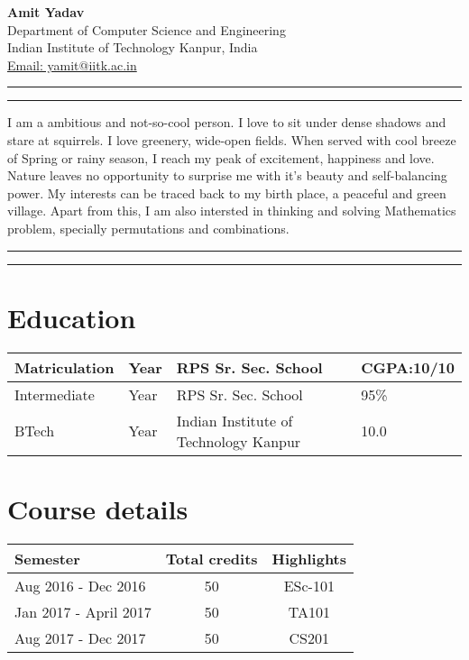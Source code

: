 \documentclass{article}
\begin{document}
\noindent\textbf{Amit Yadav}\\
Department of Computer Science and Engineering \\
Indian Institute of Technology Kanpur, India\\
\href{yamit@iitk.ac.in}{Email: yamit@iitk.ac.in}\\
\hrule
\vspace{1mm}
\hrule
\vspace{1mm}
\noindent I am a ambitious and not-so-cool person. I love to sit under dense shadows and stare at squirrels. I love greenery, wide-open fields. When served with cool breeze of Spring or rainy season, I reach my peak of excitement, happiness and  love. Nature leaves no opportunity to surprise me with it's beauty and self-balancing power. My interests can be traced back to my birth place, a peaceful and green village.
Apart from this, I am also intersted in thinking and solving Mathematics problem, specially permutations and combinations.
\vspace{1mm}
\hrule
\vspace{1mm}
\hrule

\section*{Education}
\begin{tabular}{|l|l|l|l|}
\hline
    Matriculation & Year & RPS Sr. Sec. School & CGPA:10/10\\
\hline
    Intermediate & Year & RPS Sr. Sec. School & 95\%\\
\hline
    BTech & Year & Indian Institute of Technology Kanpur & 10.0 \\
\hline
\end{tabular}

\section*{Course details}
\begin{tabular}{|l|c|c|}
    \hline
    \textbf{Semester} & \textbf{Total credits} & \textbf{Highlights} \\
    \hline
     Aug 2016 - Dec 2016 & 50 & ESc-101 \\
     \hline
     Jan 2017 - April 2017 & 50 & TA101 \\
     \hline
     Aug 2017 - Dec 2017 & 50 & CS201 \\
     \hline
\end{tabular}
\end{document}

